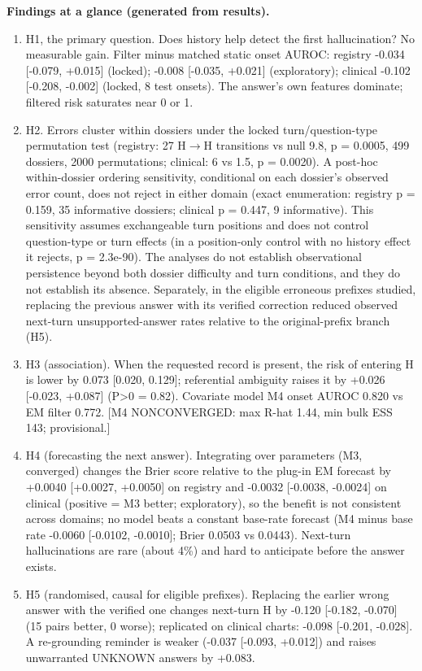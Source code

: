 \textbf{Findings at a glance (generated from results).}
\begin{enumerate}[leftmargin=*,itemsep=2pt]\item H1, the primary question. Does history help detect the first hallucination? No measurable gain. Filter minus matched static onset AUROC: registry -0.034 [-0.079, +0.015] (locked); -0.008 [-0.035, +0.021] (exploratory); clinical -0.102 [-0.208, -0.002] (locked, 8 test onsets). The answer's own features dominate; filtered risk saturates near 0 or 1.
\item H2. Errors cluster within dossiers under the locked turn/question-type permutation test (registry: 27 H$\to$H transitions vs null 9.8, p = 0.0005, 499 dossiers, 2000 permutations; clinical: 6 vs 1.5, p = 0.0020). A post-hoc within-dossier ordering sensitivity, conditional on each dossier's observed error count, does not reject in either domain (exact enumeration: registry p = 0.159, 35 informative dossiers; clinical p = 0.447, 9 informative). This sensitivity assumes exchangeable turn positions and does not control question-type or turn effects (in a position-only control with no history effect it rejects, p = 2.3e-90). The analyses do not establish observational persistence beyond both dossier difficulty and turn conditions, and they do not establish its absence. Separately, in the eligible erroneous prefixes studied, replacing the previous answer with its verified correction reduced observed next-turn unsupported-answer rates relative to the original-prefix branch (H5).
\item H3 (association). When the requested record is present, the risk of entering H is lower by 0.073 [0.020, 0.129]; referential ambiguity raises it by +0.026 [-0.023, +0.087] (P>0 = 0.82). Covariate model M4 onset AUROC 0.820 vs EM filter 0.772. [M4 NONCONVERGED: max R-hat 1.44, min bulk ESS 143; provisional.]
\item H4 (forecasting the next answer). Integrating over parameters (M3, converged) changes the Brier score relative to the plug-in EM forecast by +0.0040 [+0.0027, +0.0050] on registry and -0.0032 [-0.0038, -0.0024] on clinical (positive = M3 better; exploratory), so the benefit is not consistent across domains; no model beats a constant base-rate forecast (M4 minus base rate -0.0060 [-0.0102, -0.0010]; Brier 0.0503 vs 0.0443). Next-turn hallucinations are rare (about 4\%) and hard to anticipate before the answer exists.
\item H5 (randomised, causal for eligible prefixes). Replacing the earlier wrong answer with the verified one changes next-turn H by -0.120 [-0.182, -0.070] (15 pairs better, 0 worse); replicated on clinical charts: -0.098 [-0.201, -0.028]. A re-grounding reminder is weaker (-0.037 [-0.093, +0.012]) and raises unwarranted UNKNOWN answers by +0.083.

\end{enumerate}
